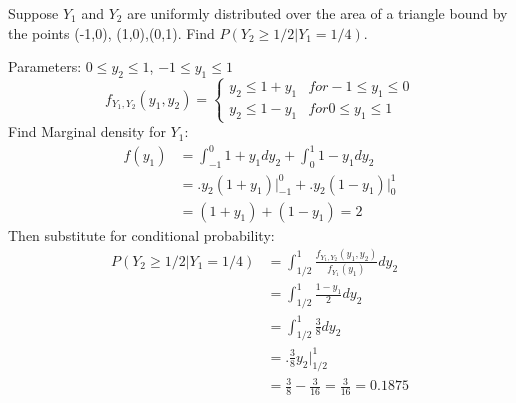 \documentclass[answers]{exam}
\begin{document}
\begin{questions}
\setcounter{question}{12}

\question 
Suppose $Y_1$ and $Y_2$ are uniformly distributed over the area of a triangle bound by the points {(-1,0), (1,0),(0,1)}. Find $P(Y_2\geq1/2|Y_1=1/4)$.
\begin{solution}
	Parameters: $0\leq y_2\leq1$, $-1\leq y_1\leq1$ 
	\[f_{Y_1,Y_2}(y_1,y_2) = \begin{cases}
		y_2\leq 1+y_1 & for -1\leq y_1\leq0 \\
		y_2\leq 1-y_1 & for 0\leq y_1\leq1 
	\end{cases}\]
	Find Marginal density for $Y_1$:
	\begin{align*}
		f(y_1)
		&= \int_{-1}^{0} 1+y_1 dy_2 + \int_{0}^{1} 1-y_1 dy_2 \\
		&= \bigg. y_2(1+y_1) \bigg|_{-1}^{0} + \bigg. y_2(1-y_1) \bigg|_{0}^{1} \\
		&= (1+y_1) + (1-y_1) = 2
	\end{align*}
	Then substitute for conditional probability:
	\begin{align*}
		P(Y_2\geq1/2|Y_1=1/4)
		&= \int_{1/2}^{1}\frac{f_{Y_1,Y_2}(y_1,y_2)}{f_{Y_1}(y_1)} dy_2 \\
		&= \int_{1/2}^{1}\frac{1-y_1}{2} dy_2 \\
		&= \int_{1/2}^{1}\frac{3}{8} dy_2 \\
		&= \bigg. \frac{3}{8}y_2 \bigg|_{1/2}^{1} \\
		&= \frac{3}{8} - \frac{3}{16} = \frac{3}{16} = 0.1875
	\end{align*}
\end{solution}


\end{questions}
\end{document}
